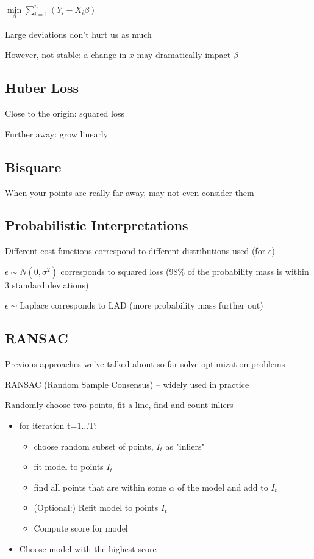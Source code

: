 \documentclass[twoside]{article}
\begin{document}
$\min\limits_{\beta} \sum\limits_{i=1}^n ( Y_i - X_i \beta)$

Large deviations don't hurt us as much

However, not stable: a change in $x$ may dramatically impact $\beta$

\subsection{Huber Loss}

Close to the origin: squared loss

Further away: grow linearly

\subsection{Bisquare}

When your points are really far away, may not even consider them

\subsection{Probabilistic Interpretations}

Different cost functions correspond to different distributions used (for $\epsilon$)

$\epsilon \sim N(0,\sigma^2)$ corresponds to squared loss (98\% of the probability mass is within 3 standard deviations)

$\epsilon \sim \text{Laplace}$ corresponds to LAD (more probability mass further out)

\subsection{RANSAC}

Previous approaches we've talked about so far solve optimization problems

RANSAC (Random Sample Consensus) -- widely used in practice

Randomly choose two points, fit a line, find and count inliers

\begin{itemize}
\item for iteration t=1...T:
    \begin{itemize}
    \item choose random subset of points, $I_t$ as "inliers"
    \item fit model to points $I_t$
    \item find all points that are within some $\alpha$ of the model and add to $I_t$
    \item (Optional:) Refit model to points $I_t$
    \item Compute score for model
    \end{itemize}
\item Choose model with the highest score
\end{itemize}
\end{document}
